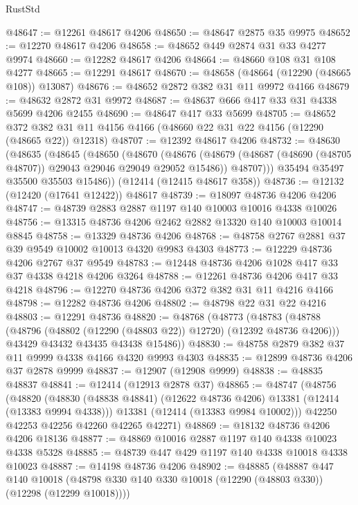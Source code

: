 \begin{lexlean}{RustStd}
\begin{coremodule}
@48647 := @12261 @48617 @4206
@48650 := @48647 @2875 @35 @9975
@48652 := @12270 @48617 @4206
@48658 := @48652 @449 @2874 @31 @33 @4277 @9974
@48660 := @12282 @48617 @4206
@48664 := @48660 @108 @31 @108 @4277
@48665 := @12291 @48617
@48670 := @48658 (@48664 (@12290 (@48665 @108)) @13087)
@48676 := @48652 @2872 @382 @31 @11 @9972 @4166
@48679 := @48632 @2872 @31 @9972
@48687 := @48637 @666 @417 @33 @31 @4338 @5699 @4206 @2455
@48690 := @48647 @417 @33 @5699
@48705 := @48652
    @372
    @382
    @31
    @11
    @4156
    @4166
    (@48660 @22 @31 @22 @4156 (@12290 (@48665 @22)) @12318)
@48707 := @12392 @48617 @4206
@48732 := @48630
    (@48635
      (@48645
        (@48650
          (@48670
            (@48676
              (@48679 (@48687 (@48690 (@48705 @48707)) @29043 @29046 @29049 @29052 @15486))
              @48707)))
        @35494
        @35497
        @35500
        @35503
        @15486))
    (@12414 (@12415 @48617 @358))
@48736 := @12132 (@12420 (@17641 @12422)) @48617
@48739 := @18097 @48736 @4206 @4206
@48747 := @48739 @2883 @2887 @1197 @140 @10003 @10016 @4338 @10026
@48756 := @13315 @48736 @4206 @2462 @2882 @13320 @140 @10003 @10014 @8845
@48758 := @13329 @48736 @4206
@48768 := @48758 @2767 @2881 @37 @39 @9549 @10002 @10013 @4320 @9983 @4303
@48773 := @12229 @48736 @4206 @2767 @37 @9549
@48783 := @12448 @48736 @4206 @1028 @417 @33 @37 @4338 @4218 @4206 @3264
@48788 := @12261 @48736 @4206 @417 @33 @4218
@48796 := @12270 @48736 @4206 @372 @382 @31 @11 @4216 @4166
@48798 := @12282 @48736 @4206
@48802 := @48798 @22 @31 @22 @4216
@48803 := @12291 @48736
@48820 := @48768
    (@48773
      (@48783
        (@48788 (@48796 (@48802 (@12290 (@48803 @22)) @12720) (@12392 @48736 @4206)))
        @43429
        @43432
        @43435
        @43438
        @15486))
@48830 := @48758 @2879 @382 @37 @11 @9999 @4338 @4166 @4320 @9993 @4303
@48835 := @12899 @48736 @4206 @37 @2878 @9999
@48837 := @12907 (@12908 @9999)
@48838 := @48835 @48837
@48841 := @12414 (@12913 @2878 @37)
@48865 := @48747
    (@48756
      (@48820
        (@48830 (@48838 @48841) (@12622 @48736 @4206) @13381 (@12414 (@13383 @9994 @4338)))
        @13381
        (@12414 (@13383 @9984 @10002)))
      @42250
      @42253
      @42256
      @42260
      @42265
      @42271)
@48869 := @18132 @48736 @4206 @4206 @18136
@48877 := @48869 @10016 @2887 @1197 @140 @4338 @10023 @4338 @5328
@48885 := @48739 @447 @429 @1197 @140 @4338 @10018 @4338 @10023
@48887 := @14198 @48736 @4206
@48902 := @48885
    (@48887
      @447
      @140
      @10018
      (@48798 @330 @140 @330 @10018 (@12290 (@48803 @330)) (@12298 (@12299 @10018))))

\end{coremodule}
\end{lexlean}
